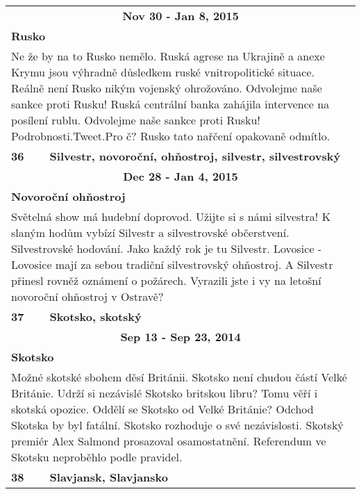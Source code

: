 \begin{tabularx}{\linewidth}{l l}
                \multicolumn{2}{c}{\bf Nov 30 - Jan 8, 2015} \\
                \multicolumn{2}{p{\linewidth}}{\bf Rusko} \\
                \multicolumn{2}{p{\linewidth}}{Ne že by na to Rusko nemělo. Ruská agrese na Ukrajině a anexe Krymu jsou výhradně důsledkem ruské vnitropolitické situace. Reálně není Rusko nikým vojenský ohrožováno. Odvolejme naše sankce proti Rusku! Ruská centrální banka zahájila intervence na posílení rublu. Odvolejme naše sankce proti Rusku! Podrobnosti.Tweet.Pro č? Rusko tato nařčení opakovaně odmítlo.} \\ \midrule
                [1.5pt]

            \bf 36 & \bf Silvestr, novoroční, ohňostroj, silvestr, silvestrovský \\ \midrule
            
                \multicolumn{2}{c}{\bf Dec 28 - Jan 4, 2015} \\
                \multicolumn{2}{p{\linewidth}}{\bf Novoroční ohňostroj} \\
                \multicolumn{2}{p{\linewidth}}{Světelná show má hudební doprovod. Užijte si s námi silvestra! K slaným hodům vybízí Silvestr a silvestrovské občerstvení. Silvestrovské hodování. Jako každý rok je tu Silvestr. Lovosice - Lovosice mají za sebou tradiční silvestrovský ohňostroj. A Silvestr přinesl rovněž oznámení o požárech. Vyrazili jste i vy na letošní novoroční ohňostroj v Ostravě?} \\ \midrule
                [1.5pt]

            \bf 37 & \bf Skotsko, skotský \\ \midrule
            
                \multicolumn{2}{c}{\bf Sep 13 - Sep 23, 2014} \\
                \multicolumn{2}{p{\linewidth}}{\bf Skotsko} \\
                \multicolumn{2}{p{\linewidth}}{Možné skotské sbohem děsí Británii. Skotsko není chudou částí Velké Británie. Udrží si nezávislé Skotsko britskou libru? Tomu věří i skotská opozice. Oddělí se Skotsko od Velké Británie? Odchod Skotska by byl fatální. Skotsko rozhoduje o své nezávislosti. Skotský premiér Alex Salmond prosazoval osamostatnění. Referendum ve Skotsku neproběhlo podle pravidel.} \\ \midrule
                [1.5pt]

            \bf 38 & \bf Slavjansk, Slavjansko \\ \midrule
            

\end{tabularx}
